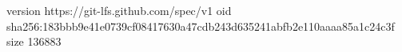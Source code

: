 version https://git-lfs.github.com/spec/v1
oid sha256:183bbb9e41e0739cf08417630a47cdb243d635241abfb2e110aaaa85a1c24c3f
size 136883
